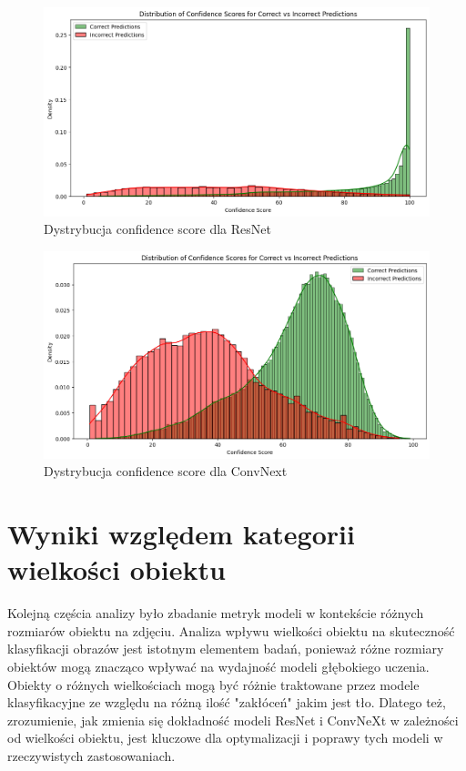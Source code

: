 \begin{figure}
	\centering\includegraphics[width=.9\textwidth]{img/resnet_conf_distro}
	\caption{Dystrybucja confidence score dla ResNet}
	\label{rys:res_c_distro}
\end{figure}

\begin{figure}
	\centering\includegraphics[width=.9\textwidth]{img/convnext_conf_distro}
	\caption{Dystrybucja confidence score dla ConvNext}
	\label{rys:conv_c_distro}
\end{figure}
\newpage

\section*{Wyniki względem kategorii wielkości obiektu}

Kolejną częścia analizy było zbadanie metryk modeli w kontekście różnych rozmiarów obiektu na zdjęciu. Analiza wpływu wielkości obiektu na skuteczność klasyfikacji obrazów jest istotnym elementem badań, ponieważ różne rozmiary obiektów mogą 
znacząco wpływać na wydajność modeli głębokiego uczenia. Obiekty o różnych wielkościach mogą być różnie traktowane przez modele klasyfikacyjne ze względu na różną ilość "zakłóceń" jakim jest tło. Dlatego też, zrozumienie, jak zmienia się 
dokładność modeli ResNet i ConvNeXt w zależności od wielkości obiektu, jest kluczowe dla optymalizacji i poprawy tych modeli w rzeczywistych zastosowaniach.



